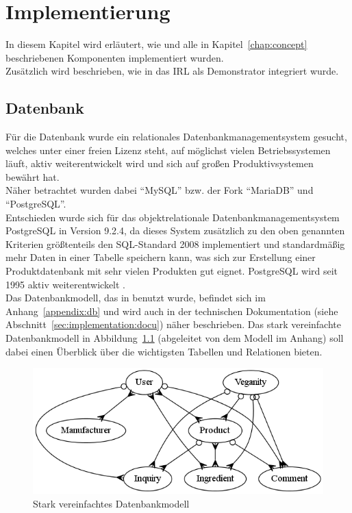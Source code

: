 \chapter{Implementierung}
\label{chap:implementation}

In diesem Kapitel wird erläutert, wie \name und alle in 
Kapitel~\ref{chap:concept} beschriebenen Komponenten implementiert wurden.\\
Zusätzlich wird beschrieben, wie \name in das \ac{IRL} als
Demonstrator integriert wurde.

\section{Datenbank}
\label{sec:implementation:db}

Für die Datenbank wurde ein relationales Datenbankmanagementsystem
gesucht, welches unter einer freien Lizenz steht, auf möglichst vielen
Betriebssystemen läuft, aktiv weiterentwickelt wird und sich auf
großen Produktivsystemen bewährt hat.\\
Näher betrachtet wurden dabei "`MySQL"' bzw. der Fork "`MariaDB"' und
"`PostgreSQL"'.\\
Entschieden wurde sich für das objektrelationale
Datenbankmanagementsystem PostgreSQL in Version 9.2.4, da dieses System
zusätzlich zu den oben genannten Kriterien größtenteils den
SQL-Standard 2008 implementiert und standardmäßig mehr Daten in
einer Tabelle
speichern kann, was sich zur Erstellung einer Produktdatenbank mit sehr vielen 
Produkten gut eignet.
PostgreSQL wird seit 1995 aktiv weiterentwickelt
.\\
Das Datenbankmodell, das in \name benutzt wurde, befindet sich im
Anhang~\ref{appendix:db} und wird auch in der technischen
Dokumentation (siehe Abschnitt~\ref{sec:implementation:docu}) näher beschrieben.
Das stark vereinfachte Datenbankmodell in Abbildung~\ref{img:mini_models} 
(abgeleitet von dem Modell im Anhang) soll dabei einen 
Überblick über die wichtigsten Tabellen und Relationen bieten.

\begin{figure}[ht]
  \centering
  \includegraphics[scale=0.6]{misc/mini_models.png}
  \caption{Stark vereinfachtes Datenbankmodell}
  \label{img:mini_models}
\end{figure}

